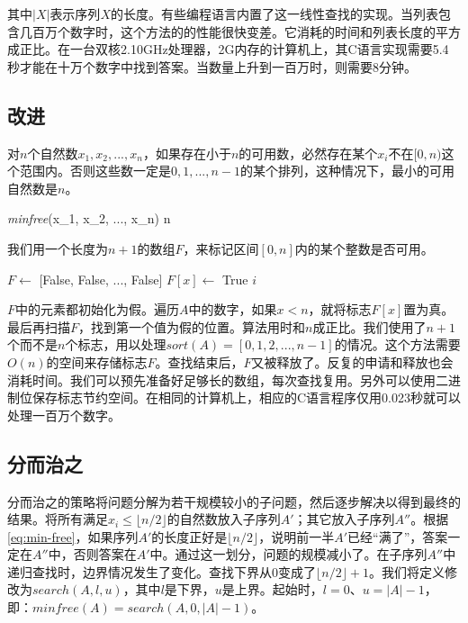 \documentclass[b5paper]{ctexart}
\begin{document}
其中$|X|$表示序列$X$的长度。有些编程语言内置了这一线性查找的实现。当列表包含几百万个数字时，这个方法的的性能很快变差。它消耗的时间和列表长度的平方成正比。在一台双核2.10GHz处理器，2G内存的计算机上，其C语言实现需要5.4秒才能在十万个数字中找到答案。当数量上升到一百万时，则需要8分钟。

\subsection*{改进}
对$n$个自然数$x_1, x_2, ..., x_n$，如果存在小于$n$的可用数，必然存在某个$x_i$不在$[0, n)$这个范围内。否则这些数一定是$0, 1, ..., n - 1$的某个排列，这种情况下，最小的可用自然数是$n$。

\be
\textit{minfree}(x_1, x_2, ..., x_n) \leq n
\label{eq:min-free}
\ee

我们用一个长度为$n + 1$的数组$F$，来标记区间$[0, n]$内的某个整数是否可用。

\begin{algorithmic}[1]
  \State $F \gets$ [False, False, ..., False] 
      \State $F[x] \gets$ True
    \EndIf
  \EndFor
      \State \Return $i$
    \EndIf
  \EndFor
\EndFunction
\end{algorithmic}

$F$中的元素都初始化为假。遍历$A$中的数字，如果$x < n$，就将标志$F[x]$置为真。最后再扫描$F$，找到第一个值为假的位置。算法用时和$n$成正比。我们使用了$n + 1$个而不是$n$个标志，用以处理$sort(A) = [0, 1, 2, ..., n-1]$的情况。这个方法需要$O(n)$的空间来存储标志$F$。查找结束后，$F$又被释放了。反复的申请和释放也会消耗时间。我们可以预先准备好足够长的数组，每次查找复用。另外可以使用二进制位保存标志节约空间。在相同的计算机上，相应的C语言程序仅用0.023秒就可以处理一百万个数字。

\subsection*{分而治之}
分而治之的策略将问题分解为若干规模较小的子问题，然后逐步解决以得到最终的结果。将所有满足$x_i \leq \lfloor n/2 \rfloor$的自然数放入子序列$A'$；其它放入子序列$A''$。根据\cref{eq:min-free}，如果序列$A'$的长度正好是$\lfloor n/2 \rfloor$，说明前一半$A'$已经“满了”，答案一定在$A''$中，否则答案在$A'$中。通过这一划分，问题的规模减小了。在子序列$A''$中递归查找时，边界情况发生了变化。查找下界从0变成了$\lfloor n/2 \rfloor + 1$。我们将定义修改为$search(A, l, u)$，其中$l$是下界，$u$是上界。起始时，$l = 0$、$u = |A| - 1$，即：$minfree(A) = search(A, 0, |A|-1)$。
\end{document}
